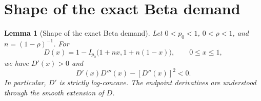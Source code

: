 \documentclass[11pt]{article}
\newtheorem{lemma}{Lemma}
\begin{document}
\clearpage
\appendix
\section{Shape of the exact Beta demand}
\label{app:beta-demand}

\begin{lemma}[Shape of the exact Beta demand]\label{lem:beta-marginal-demand}
Let $0<p_0<1$, $0<\rho<1$, and $n=(1-\rho)^{-1}$. For
\begin{equation*}
D(x)=1-I_{p_0}\bigl(1+nx,1+n(1-x)\bigr),\qquad 0\le x\le1,
\end{equation*}
we have $D'(x)>0$ and
\begin{equation*}
D'(x)D'''(x)-[D''(x)]^2<0.
\end{equation*}
In particular, $D'$ is strictly log-concave. The endpoint derivatives are
understood through the smooth extension of $D$.
\end{lemma}
\end{document}
